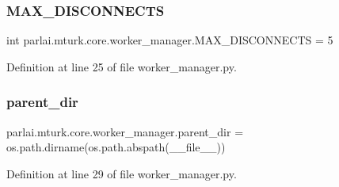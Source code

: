 \subsubsection{\texorpdfstring{M\+A\+X\+\_\+\+D\+I\+S\+C\+O\+N\+N\+E\+C\+TS}{MAX\_DISCONNECTS}}
{\footnotesize\ttfamily int parlai.\+mturk.\+core.\+worker\+\_\+manager.\+M\+A\+X\+\_\+\+D\+I\+S\+C\+O\+N\+N\+E\+C\+TS = 5}



Definition at line 25 of file worker\+\_\+manager.\+py.

\mbox{\label{namespaceparlai_1_1mturk_1_1core_1_1worker__manager_ad55d781239dedaf5a8409f99a5b181ed}} 
\subsubsection{\texorpdfstring{parent\+\_\+dir}{parent\_dir}}
{\footnotesize\ttfamily parlai.\+mturk.\+core.\+worker\+\_\+manager.\+parent\+\_\+dir = os.\+path.\+dirname(os.\+path.\+abspath(\+\_\+\+\_\+file\+\_\+\+\_\+))}



Definition at line 29 of file worker\+\_\+manager.\+py.

